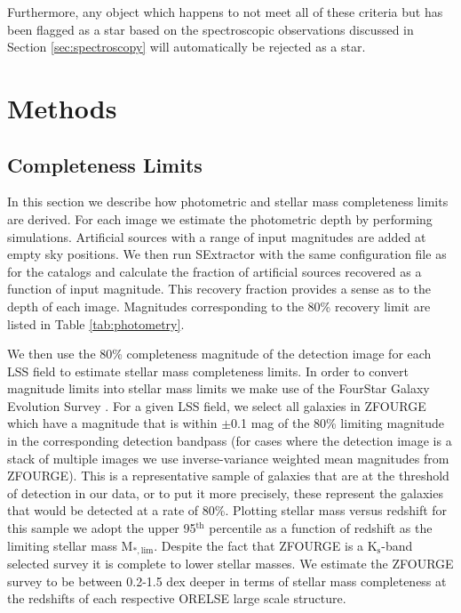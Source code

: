 \documentclass[a4paper,fleqn,usenatbib]{mnras}
\begin{document}
Furthermore, any object which happens to not meet all of these criteria but has been flagged as a star based on the spectroscopic observations discussed in Section \ref{sec:spectroscopy} will automatically be rejected as a star.



\section{Methods}
\label{sec:methods}


\subsection{Completeness Limits}
\label{sec:masslimits}


In this section we describe how photometric and stellar mass completeness limits are derived.
For each image we estimate the photometric depth by performing simulations.
Artificial sources with a range of input magnitudes are added at empty sky positions.
We then run SExtractor with the same configuration file as for the catalogs and calculate the fraction of artificial sources recovered as a function of input magnitude.
This recovery fraction provides a sense as to the depth of each image.
Magnitudes corresponding to the 80\% recovery limit are listed in Table \ref{tab:photometry}.


We then use the 80\% completeness magnitude of the detection image for each LSS field to estimate stellar mass completeness limits.
In order to convert magnitude limits into stellar mass limits we make use of the FourStar Galaxy Evolution Survey \citep[ZFOURGE:][]{Straatman2016}.
For a given LSS field, we select all galaxies in ZFOURGE which have a magnitude that is within $\pm$0.1 mag of the 80\% limiting magnitude in the corresponding detection bandpass (for cases where the detection image is a stack of multiple images we use inverse-variance weighted mean magnitudes from ZFOURGE).
This is a representative sample of galaxies that are at the threshold of detection in our data, or to put it more precisely, these represent the galaxies that would be detected at a rate of 80\%.
Plotting stellar mass versus redshift for this sample we adopt the upper 95$^{\mathrm{th}}$ percentile as a function of redshift as the limiting stellar mass M$_{*, \mathrm{lim}}$.
Despite the fact that ZFOURGE is a K$_{\mathrm{s}}$-band selected survey it is complete to lower stellar masses.
We estimate the ZFOURGE survey to be between 0.2-1.5 dex deeper in terms of stellar mass completeness at the redshifts of each respective ORELSE large scale structure.
\end{document}

